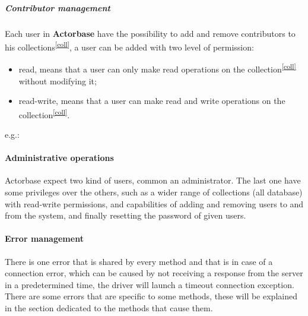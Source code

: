 \documentclass{scalatekids-article}
\begin{document}
\subparagraph{Contributor management}

Each user in \textbf{Actorbase} have the possibility to add and remove contributors
to his collections\textsuperscript{\ref{coll}}, a user can be added with two level of
permission:
\begin{itemize}
\item read, means that a user can only make read operations on the collection\textsuperscript{\ref{coll}} without modifying it;
\item read-write, means that a user can make read and write operations on the collection\textsuperscript{\ref{coll}}.
\end{itemize}
e.g.:

\paragraph{Administrative operations}

Actorbase expect two kind of users, common an administrator. The last one have
some privileges over the others, such as a wider range of collections (all
database) with read-write permissions, and capabilities of adding and removing
users to and from the system, and finally resetting the password of given users.

\paragraph{Error management}

There is one error that is shared by every method and that is in case of a
connection error, which can be caused by not receiving a response from the
server in a predetermined time, the driver will launch a timeout connection
exception. There are some errors that are specific to some methods, these will
be explained in the section dedicated to the methods that cause them.

\end{document}
